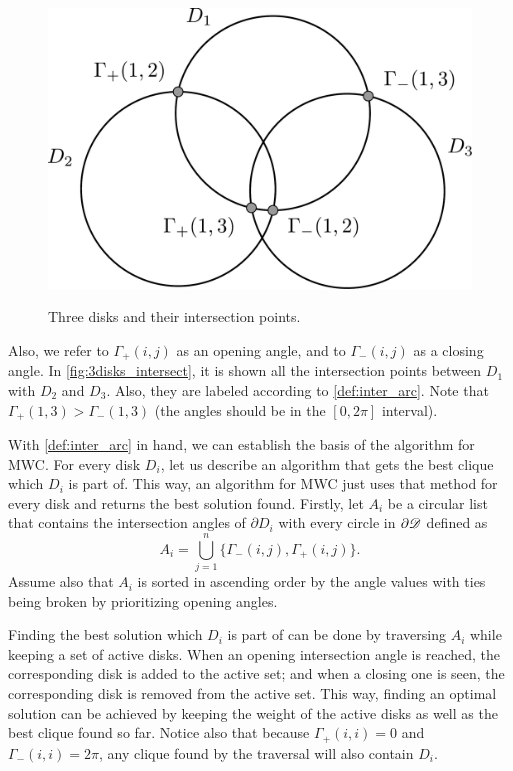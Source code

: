 \begin{figure}
\centering

    \caption{Three disks and their intersection points.}
    \includegraphics[scale=.3]{tex/figures/3_disks_intersect.pdf}
%    
    \fautor
    \label{fig:3disks_intersect}
\end{figure}

Also, we refer to $\Gamma_+(i,j)$ as an opening angle, and to $\Gamma_-(i,j)$ as a closing angle. In \autoref{fig:3disks_intersect}, it is shown all the intersection points between $D_1$ with $D_2$ and $D_3$. Also, they are labeled according to \autoref{def:inter_arc}. Note that $\Gamma_+(1,3) > \Gamma_-(1,3)$ (the angles should be in the $[0,2\pi]$ interval).

With \autoref{def:inter_arc} in hand, we can establish the basis of the algorithm for MWC. For every disk $D_i$, let us describe an algorithm that gets the best clique which $D_i$ is part of. This way, an algorithm for MWC just uses that method for every disk and returns the best solution found. Firstly, let $A_i$ be a circular list that contains the intersection angles of $\partial D_i$ with every circle in $\partial \mathscr{D}$ defined as
\begin{equation*}
A_i = \bigcup_{j=1}^n \{ \Gamma_-(i,j), \Gamma_+(i,j) \}.
\end{equation*}
Assume also that $A_i$ is sorted in ascending order by the angle values with ties being broken by prioritizing opening angles.

Finding the best solution which $D_i$ is part of can be done by traversing $A_i$ while keeping a set of active disks. When an opening intersection angle is reached, the corresponding disk is added to the active set; and when a closing one is seen, the corresponding disk is removed from the active set. This way, finding an optimal solution can be achieved by keeping the weight of the active disks as well as the best clique found so far. Notice also that because $\Gamma_+(i,i)=0$ and $\Gamma_-(i,i)=2\pi$, any clique found by the traversal will also contain $D_i$.


